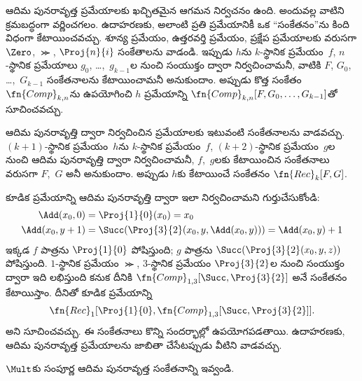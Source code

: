\documentclass[../../../include/open-logic-section]{subfiles}
\begin{document}

ఆదిమ పునరావృత్త ప్రమేయాలకు ఖచ్చితమైన ఆగమన నిర్వచనం ఉంది. అందువల్ల
వాటిని క్రమబద్ధంగా వర్ణించగలం. ఉదాహరణకు, అలాంటి ప్రతి ప్రమేయానికీ ఒక
``సంకేతనం''ను కింది విధంగా కేటాయించవచ్చు. శూన్య ప్రమేయం, ఉత్తరవర్తి ప్రమేయం,
ప్రక్షేప ప్రమేయాలకు వరుసగా $\Zero$, $\Succ$, $\Proj{n}{i}$ సంకేతాలను
వాడండి. ఇప్పుడు $h$ను $k$-స్థానిక ప్రమేయం~$f$, $n$-స్థానిక
ప్రమేయాలు $g_0$, \dots,~$g_{k-1}$ల నుంచి సంయుక్తం ద్వారా
నిర్వచించామనీ, వాటికి $F$, $G_0$, \dots,~$G_{k-1}$
సంకేతనాలను కేటాయించామనీ అనుకుందాం. అప్పుడు కొత్త సంకేతం
$\fn{Comp}_{k,n}$ను ఉపయోగించి $h$ ప్రమేయాన్ని
$\fn{Comp}_{k,n}[F,G_0,\dots,G_{k-1}]$తో సూచించవచ్చు.

ఆదిమ పునరావృత్తి ద్వారా నిర్వచించిన ప్రమేయాలకు ఇటువంటి సంకేతనాలను
వాడవచ్చు. $(k+1)$-స్థానిక ప్రమేయం~$h$ను $k$-స్థానిక ప్రమేయం~$f$,
$(k+2)$-స్థానిక ప్రమేయం~$g$ల నుంచి ఆదిమ పునరావృత్తి ద్వారా
నిర్వచించామనీ, $f$,~$g$లకు కేటాయించిన సంకేతనాలు వరుసగా $F$,~$G$
అనీ అనుకుందాం. అప్పుడు $h$కు కేటాయించే సంకేతనం $\fn{Rec}_k[F,G]$.

కూడిక ప్రమేయాన్ని ఆదిమ పునరావృత్తి ద్వారా ఇలా నిర్వచించామని
గుర్తుచేసుకోండి:
\begin{align*}
  \Add(x_0, 0) & = \Proj{1}{0}(x_0) = x_0\\
  \Add(x_0, y+1) & = \Succ(\Proj{3}{2}(x_0, y, \Add(x_0, y))) = \Add(x_0, y) +1
\end{align*}
ఇక్కడ $f$ పాత్రను $\Proj{1}{0}$ పోషిస్తుంది; $g$ పాత్రను
$\Succ(\Proj{3}{2}(x_0,y,z))$ పోషిస్తుంది. $1$-స్థానిక ప్రమేయం
$\Succ$, $3$-స్థానిక ప్రమేయం $\Proj{3}{2}$ల నుంచి సంయుక్తం ద్వారా ఇది
లభిస్తుంది కనుక దీనికి $\fn{Comp}_{1,3}[\Succ,\Proj{3}{2}]$ అనే
సంకేతనం కేటాయిస్తాం. దీనితో కూడిక ప్రమేయాన్ని
\[
\fn{Rec}_1[\Proj{1}{0},\fn{Comp}_{1,3}[\Succ,\Proj{3}{2}]].
\]
అని సూచించవచ్చు. ఈ సంకేతనాలు కొన్ని సందర్భాల్లో ఉపయోగపడతాయి. ఉదాహరణకు, ఆదిమ
పునరావృత్త ప్రమేయాలను జాబితా చేసేటప్పుడు వీటిని వాడవచ్చు.

\begin{prob}
  $\Mult$కు సంపూర్ణ ఆదిమ పునరావృత్త సంకేతనాన్ని ఇవ్వండి.
\end{prob}
\end{document}
